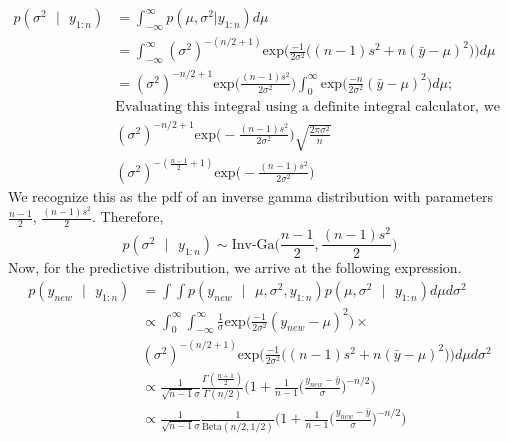 \documentclass[11pt]{article}
\begin{document}
\begin{equation}
  \nonumber
  \begin{aligned}
    p(\sigma^2 \text{ }|\text{ } y_{1:n}) & = \int_{-\infty}^{\infty} p(\mu, \sigma^2 \text{} | \text{} y_{1:n}) d \mu \\
    & = \int_{-\infty}^{\infty} (\sigma^2)^{-(n/2+1)  }\text{exp}\bigg(\frac{-1}{2 \sigma^2}\big((n-1)s^2 + n(\bar{y} - \mu)^2\big)\bigg) d \mu\\
    & =  (\sigma^2)^{-n/2+1} \text{exp}\bigg(\frac{(n-1)s^2}{2 \sigma^2}\bigg) \int_{0}^{\infty} \text{exp}\bigg(\frac{-n}{2 \sigma^2}(\bar{y} - \mu)^2\bigg) d \mu;\\
    & \text{Evaluating this integral using a definite integral calculator, we get}\\
    & (\sigma^2)^{-n/2+1}\text{exp}\bigg(-\frac{(n-1)s^2}{2 \sigma^2}\bigg)\sqrt{\frac{2 \pi \sigma^2}{n}}\\
    & (\sigma^2)^{-(\frac{n-1}{2} + 1)}\text{exp}\bigg(-\frac{(n-1)s^2}{2 \sigma^2}\bigg)
  \end{aligned}
\end{equation}
We recognize this as the pdf of an inverse gamma distribution with parameters $\frac{n-1}{2}$, $\frac{(n-1)s^2}{2}$. Therefore,
\begin{equation}
  \nonumber
  p(\sigma^2 \text{ } | \text{ } y_{1:n}) \sim \text{Inv-Ga}\bigg(\frac{n-1}{2}, \frac{(n-1)s^2}{2}\bigg)
\end{equation}
Now, for the predictive distribution, we arrive at the following expression.
\begin{equation}
  \nonumber
  \begin{aligned}
    p(y_{new} \text{ }|\text{ } y_{1:n}) & = \int \int p(y_{new} \text{ }|\text{ } \mu, \sigma^2,y_{1:n})p(\mu, \sigma^2 \text{ }|\text{ } y_{1:n}) d \mu d \sigma^2\\
    & \propto \int_{0}^{\infty} \int_{-\infty}^{\infty} \frac{1}{ \sigma}\text{exp}\bigg(\frac{-1}{2 \sigma^2}(y_{new} - \mu)^2 \bigg) \times \\
    & (\sigma^2)^{-(n/2+1)  }\text{exp}\bigg(\frac{-1}{2 \sigma^2}\big((n-1)s^2 + n(\bar{y} - \mu)^2\big)\bigg) d \mu d \sigma^2\\
    & \propto \frac{1}{\sqrt{n-1}\sigma}\frac{\Gamma(\frac{n+1}{2})}{\Gamma(n/2)}\bigg(1 + \frac{1}{n-1}\bigg(\frac{y_{new} - \bar{y}}{\sigma}\bigg)^{-n/2}\bigg)\\
    & \propto  \frac{1}{\sqrt{n-1}\sigma}\frac{1}{\text{Beta}(n/2, 1/2)}\bigg(1 + \frac{1}{n-1}\bigg(\frac{y_{new} - \bar{y}}{\sigma}\bigg)^{-n/2}\bigg)\\
  \end{aligned}
\end{equation}
\end{document}
